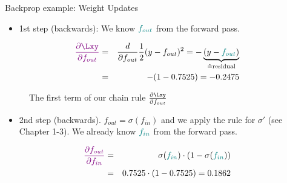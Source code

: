 \begin{vbframe}{Backprop example: Weight Updates}
\begin{figure}
  \end{figure}
\framebreak
  \begin{itemize}
    \item 1st step (backwards): We know $\textcolor{teal}{f_{out}}$ from the forward pass. 
  \end{itemize}
    \begin{eqnarray*}
      \textcolor{violet}{\frac{\partial \Lxy}{\partial f_{out}}} &=& \frac{d}{\partial f_{out}} \frac{1}{2}(y - f_{out})^2 = -\underbrace{(y - \textcolor{teal}{f_{out}})}_{\hat{=} \text{residual}} \\
       &=& -(1 - \num[round-mode=places,round-precision=4]{0.7525469}) = \num[round-mode=places,round-precision=4]{-0.2474531}
    \end{eqnarray*}
    \begin{figure}
      \centering
        \caption{The first term of our chain rule $\frac{\partial \Lxy}{\partial f_{out}}$}
    \end{figure}
\framebreak
  \begin{itemize}
    \item 2nd step (backwards). $f_{out} = \sigma(f_{in})$ and we apply the rule for $\sigma'$ (see Chapter 1-3). We already know $\textcolor{teal}{f_{in}}$ from the forward pass.
  \end{itemize}
    \begin{eqnarray*}
      \textcolor{violet}{\frac{\partial f_{out}}{\partial f_{in}}}  &=& \sigma(\textcolor{teal}{f_{in}})\cdot(1-\sigma(\textcolor{teal}{f_{in}})) \\
      &=& \num[round-mode=places,round-precision=4]{0.7525469} \cdot (1 - \num[round-mode=places,round-precision=4]{0.7525469}) = \num[round-mode=places,round-precision=4]{0.1862201}

\end{eqnarray*}
\end{vbframe}
